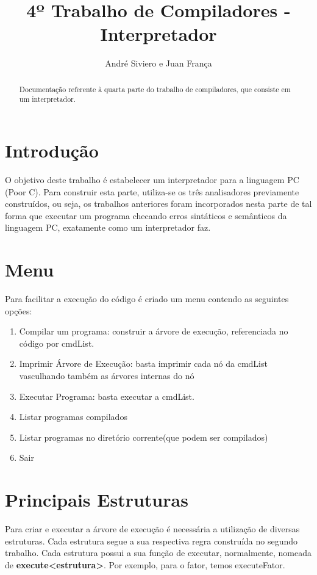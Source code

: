 \documentclass[a4paper,10pt]{article}
\title{4º Trabalho de Compiladores - Interpretador}
\author{André Siviero e Juan França}
\begin{document}
\maketitle

\begin{abstract}
Documentação referente à quarta parte do trabalho de compiladores, que consiste em um interpretador.
\end{abstract}

\section{Introdução}
O objetivo deste trabalho é estabelecer um interpretador para a linguagem PC (Poor C). Para construir esta parte, utiliza-se os três analisadores previamente construídos, ou seja,
os trabalhos anteriores foram incorporados nesta parte de tal forma que executar um programa checando erros sintáticos e semânticos da linguagem PC, exatamente como um interpretador faz.

\section{Menu}

Para facilitar a execução do código é criado um menu contendo as seguintes opções:

\begin{enumerate}
 \item Compilar um programa: construir a árvore de execução, referenciada no código por cmdList.
 \item Imprimir Árvore de Execução: basta imprimir cada nó da cmdList vasculhando também as árvores internas do nó
 \item Executar Programa: basta executar a cmdList. 
 \item Listar programas compilados
 \item Listar programas no diretório corrente(que podem ser compilados)
 \item Sair
\end{enumerate}

\section{Principais Estruturas}

Para criar e executar a árvore de execução é necessária a utilização de diversas estruturas. Cada estrutura segue a sua respectiva regra construída no segundo trabalho.
Cada estrutura possui a sua função de executar, normalmente, nomeada de \textbf{execute<estrutura>}. Por exemplo, para o fator, temos executeFator.
\end{document}
